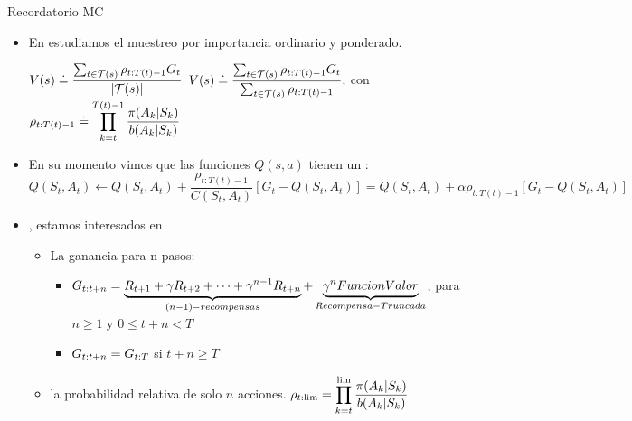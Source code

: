 \documentclass[10pt, envcountsect, handout, aspectratio=1610, hyperref={hypertexnames=true}]{beamer}
\begin{document}
\begin{frame}[label={frame:RecordatorioMC}]{Recordatorio MC}
	\begin{itemize}
		\item En  estudiamos el muestreo por importancia ordinario y ponderado. 
		
		\centerline{$\displaystyle 
		V(s) \doteq \frac{\sum_{t \in \mathcal{T}(s)} \rho_{t:T(t)-1} G_t}{|\mathcal{T}(s)|}
		$
		\qquad
		$\displaystyle 
		V(s) \doteq \frac{\sum_{t \in \mathcal{T}(s)} \rho_{t:T(t)-1} G_t}{\sum_{t \in \mathcal{T}(s)} \rho_{t:T(t)-1}},
		$
		\qquad con $\displaystyle \rho_{t:T(t)-1} \doteq \prod_{k=t}^{T(t)-1} \frac{\pi(A_k | S_k)}{b(A_k | S_k)}$}
		
		\item En su momento vimos que las funciones $Q(s,a)$ tienen  un :
		\[  Q(S_t, A_t) \gets Q(S_t, A_t) + \frac{\rho_{t:T(t)-1}}{C(S_t, A_t)}   [G_t -  Q(S_t, A_t)]
		= Q(S_t, A_t) + \alpha \rho_{t:T(t)-1}  [G_t -  Q(S_t, A_t)] \]		

		\item {}, estamos interesados en 
		
		\begin{itemize}
			\item La ganancia para n-pasos: 
				\begin{itemize}
					\item $\displaystyle G_{t:t+n} = \underbrace{R_{t+1} + \gamma R_{t+2} + \dots + \gamma^{n-1} R_{t+n}}_{(n-1)-recompensas} + \underbrace{\gamma^n FuncionValor}_{Recompensa-Truncada}$, para \( n \geq 1 \) y \( 0 \leq t +n < T \)
					
					\item $\displaystyle G_{t:t+n} = G_{t:T}$ si $t+n\geq T$
				\end{itemize}
				
			
			\item la probabilidad relativa de solo  $n$ acciones. $\displaystyle \rho_{t:\lim} = \prod_{k=t}^{\lim} \frac{\pi(A_k | S_k)}{b(A_k | S_k)}$
		\end{itemize}
	\end{itemize}

\end{frame}
\end{document}
